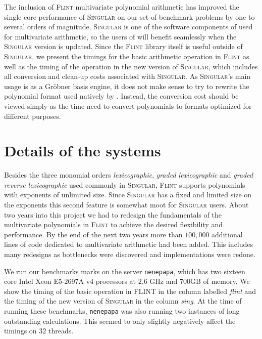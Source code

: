 \documentclass{deliverablereport}
\begin{document}
The inclusion of \textsc{Flint} multivariate polynomial arithmetic has improved the single core performance of \textsc{Singular} on our set of benchmark problems by one to several orders of magnitude. \textsc{Singular} is one of the software components of \Sage used for multivariate arithmetic, so the users of \Sage will benefit seamlessly when the \textsc{Singular} version is updated. Since the \textsc{Flint} library itself is useful outside of \textsc{Singular}, we present the timings for the basic arithmetic operation in \textsc{Flint} as well as the timing of the operation in the new version of \textsc{Singular}, which includes all conversion and clean-up costs associated with \textsc{Singular}. As \textsc{Singular}'s main usage is as a Gr\"obner basis engine, it does not make sense to try to rewrite the polynomial format used natively by . Instead, the conversion cost should be viewed simply as the time need to convert polynomials to formats optimized for different purposes.

\section{Details of the systems}
Besides the three monomial orders \emph{lexicographic}, \emph{graded lexicographic} and \emph{graded reverse lexicographic} used commonly in \textsc{Singular}, \textsc{Flint} supports polynomials with exponents of unlimited size. Since \textsc{Singular} has a fixed and limited size on the exponents this second feature is somewhat moot for \textsc{Singular} users. About two years into this project we had to redesign the fundamentals of the multivariate polynomials in \textsc{Flint} to achieve the desired flexibility and performance. By the end of the next two years more than $100,000$ additional lines of code dedicated to multivariate arithmetic had been added. This includes many redesigns as bottlenecks were discovered and implementations were redone.

We run our benchmarks marks on the server {\tt nenepapa}, which has two sixteen core Intel Xeon E5-2697A v4 processors at $2.6$ GHz and $700$GB of memory. We show the timing of the basic operation in \textsc{FLINT} in the column labelled \emph{flint} and the timing of the new version of \textsc{Singular} in the column \emph{sing}. At the time of running these benchmarks, {\tt nenepapa} was also running two instances of long outstanding calculations. This seemed to only slightly negatively affect the timings on $32$ threads. 
\end{document}
